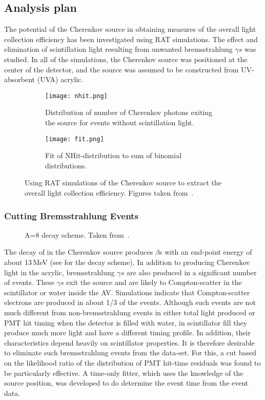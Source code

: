 \subsection{Analysis plan}
The potential of the Cherenkov source in obtaining measures of the overall light collection efficiency has been investigated using RAT simulations. The effect and elimination of scintillation light resulting from unwanted bremsstrahlung $\gamma s$  was studied.  In all of the simulations, the Cherenkov source was positioned at the center of the detector, and the source
was assumed to be constructed from UV-absorbent (UVA) acrylic.
 
 \begin{figure}
 \begin{subfigure}{.48\textwidth}
   \texttt{[image: nhit.png]}
   \caption{Distribution of number of Cherenkov photons exiting the source for events without scintillation light.}
   \label{fig:nphotons}
 \end{subfigure}
 \hspace{0.5cm}
 \begin{subfigure}{.48\textwidth}
   \texttt{[image: fit.png]}
   \caption{Fit of NHit-distribution to sum of binomial distributions.}
   \label{fig:fit}
 \end{subfigure}
 \caption{Using RAT simulations of the Cherenkov source to extract the overall light collection efficiency. Figures taken from~\cite{Heintzelman:2013}. }
 \label{fig:heintzelman-plots}
 \end{figure}
 
\subsubsection{Cutting Bremsstrahlung Events}

\begin{figure}[]
\caption{\label{fig:decayscheme} A=8 decay scheme. Taken from~\cite{Tagg:2001}.}
\end{figure}
The decay of \Li in the Cherenkov source produces $\beta$s with an end-point energy of about 13\,MeV (see  for the decay scheme). In addition to producing Cherenkov light in the acrylic, bremsstrahlung $\gamma s$ are also produced in a significant number of events.  These $\gamma s$  exit the source and are likely to Compton-scatter in the scintillator or water inside the AV.  Simulations indicate that Compton-scatter electrons are produced in about 1/3 of the events.  Although such events are not much different from non-bremsstrahlung events in either total light produced or PMT hit timing when the detector is filled with water, in scintillator fill they produce much more light and have a different timing profile.  In addition, their characteristics depend heavily on scintillator properties. It is therefore desirable to eliminate such bremsstrahlung events from the data-set. For this, a cut based on the likelihood ratio of the distribution of PMT hit-time residuals was found to be particularly effective. A time-only fitter, which uses the knowledge of the source position, was developed to do determine the event time from the event data.

